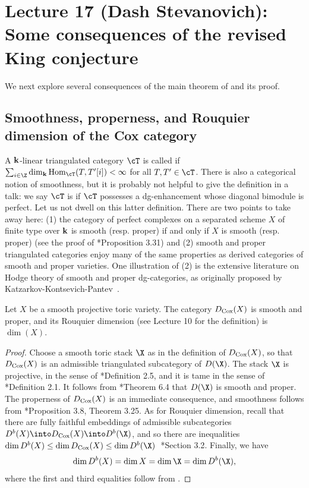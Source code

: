 \documentclass{amsart}
\begin{document}
\fi


\section{Lecture 17 (Dash Stevanovich): Some consequences of the revised King conjecture}\label{lec:17-consequences}

We next explore several consequences of the main theorem of \cite{BBB+24} and its proof.



\subsection{Smoothness, properness, and Rouquier dimension of the Cox category}\label{subsec:smooth}

A $\mathbf{k}$-linear triangulated category $\cT$ is called  if $\sum_{i \in \Z} \dim_\k \Hom_{\cT}(T, T'[i]) < \infty$ for all $T, T' \in \cT$. There is also a categorical notion of smoothness, but it is probably not helpful to give the definition in a talk: we say $\cT$ is  if $\cT$ possesses a dg-enhancement whose diagonal bimodule is perfect. Let us not dwell on this latter definition. There are two points to take away here: (1) the category of perfect complexes on a separated scheme $X$ of finite type over $\mathbf{k}$ is smooth (resp. proper) if and only if $X$ is smooth (resp. proper) (see the proof of \cite{Orlov16}*{Proposition 3.31}) and (2) smooth and proper triangulated categories enjoy many of the same properties as derived categories of smooth and proper varieties. One illustration of (2) is the extensive literature on Hodge theory of smooth and proper dg-categories, as originally proposed by Katzarkov-Kontsevich-Pantev~\cite{KKP08}.

\begin{thm} Let $X$ be a smooth projective toric variety. The category $D_{\operatorname{Cox}}(X)$ is smooth and proper, and its Rouquier dimension (see Lecture 10 for the definition) is $\dim(X)$.
\end{thm}

\begin{proof}
Choose a smooth toric stack $\X$ as in the definition of $D_{\operatorname{Cox}}(X)$, so that $D_{\operatorname{Cox}}(X)$ is an admissible triangulated subcategory of $D(\X)$. The stack $\X$ is projective, in the sense of \cite{BLS16}*{Definition 2.5}, and it is tame in the sense of \cite{BLS16}*{Definition 2.1}. It follows from \cite{BLS16}*{Theorem 6.4} that $D(\X)$ is smooth and proper. The properness of $D_{\operatorname{Cox}}(X)$ is an immediate consequence, and smoothness follows from \cite{Orlov16}*{Proposition 3.8, Theorem 3.25}. As for Rouquier dimension, recall that there are fully faithful embeddings of admissible subcategories $D^b(X) \into D_{\Cox}(X) \into D^b(\X)$, and so there are inequalities~$\dim D^b(X) \le \dim D_{\Cox}(X) \le \dim D^b(\X)$~\cite{EL21a}*{Section 3.2}. Finally, we have
$$
\dim D^b(X) = \dim{X} = \dim{\X} = \dim D^b(\X),
$$
where the first and third equalities follow from \cite{FH23, HHL24}.
\end{proof}
\end{document}
